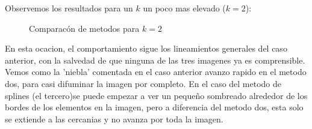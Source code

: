 Observemos los resultados para un $k$ un poco mas elevado ($k=2$):

\begin{figure}[H]
    \centering
    \qquad
    \qquad
    \caption{Comparacón de metodos para $k = 2$}
    \label{fig:example}
\end{figure}

En esta ocacion, el comportamiento sigue los lineamientos generales del caso anterior, con la salvedad de que ninguna de las tres imagenes ya es comprensible. Vemos como la 'niebla' comentada en el caso anterior avanzo rapido en el metodo dos, para casi difuminar la imagen por completo. En el caso del metodo de splines (el tercero)se puede empezar a ver un pequeño sombreado alrededor de los bordes de los elementos en la imagen, pero a diferencia del metodo dos, esta solo se extiende a las cercanias y no avanza por toda la imagen.


